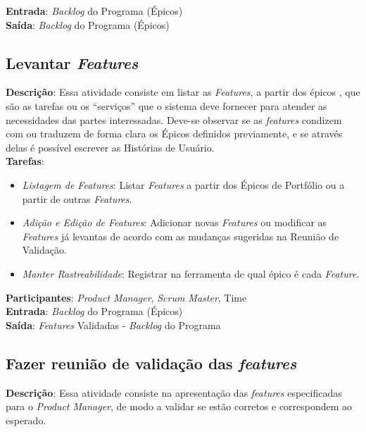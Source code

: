   \textbf{Entrada}: \textit{Backlog} do Programa (Épicos) \\

  \textbf{Saída}:  \textit{Backlog} do Programa (Épicos) \\

\subsection{Levantar \textit{Features}}
\textbf{Descrição}: Essa atividade consiste em listar as \textit{Features}, a partir dos épicos ,
que são as tarefas ou os “serviços” que o sistema deve fornecer para atender as necessidades das partes interessadas.
Deve-se observar se as \textit{features} condizem com ou traduzem de forma clara os Épicos
definidos previamente, e se através delas é possível escrever as Histórias de Usuário.\\

\textbf{Tarefas}:

  \begin{itemize}
   \item \indent \textit{Listagem de \textit{Features}}:  Listar \textit{Features} a partir dos Épicos de Portfólio ou a partir de outras \textit{Features}.

   \item \indent \textit{Adição e Edição de \textit{Features}}: Adicionar novas \textit{Features} ou modificar as \textit{Features} já levantas de acordo com as mudanças sugeridas na Reunião de Validação.

   \item \indent \textit{Manter Rastreabilidade}: Registrar na ferramenta de qual épico é cada \textit{Feature}.
   \end{itemize}

\textbf{Participantes}: \textit{Product Manager}, \textit{Scrum Master}, Time \\

\textbf{Entrada}: \textit{Backlog} do Programa (Épicos) \\

\textbf{Saída}:  \textit{Features} Validadas - \textit{Backlog} do Programa  \\

\subsection{Fazer reunião de validação das \textit{features}}
  \textbf{Descrição}: Essa atividade consiste na apresentação das \textit{features} especificadas para o \textit{Product Manager}, de modo a validar se
  estão corretos e correspondem ao esperado.  \\

